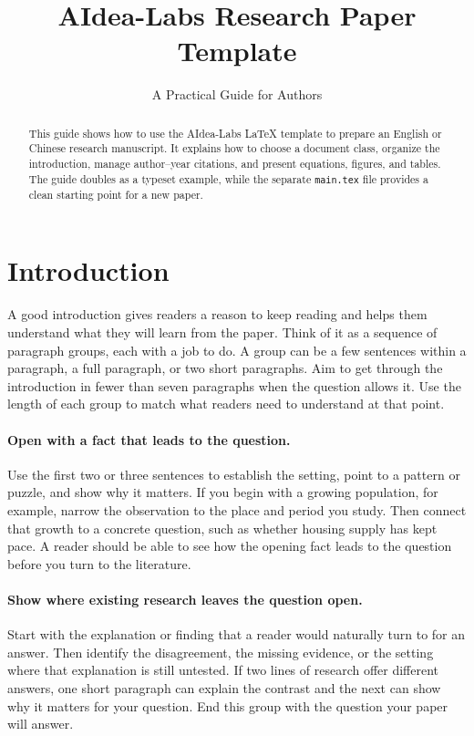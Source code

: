 \documentclass{templates/aidealabs-paper}
\title{AIdea-Labs Research Paper Template}
\subtitle{A Practical Guide for Authors}
\author{%
  \authorcontact{First Author\textsuperscript{1,*}}{first.author@aidea-labs.com}\hfill
  \authorcontact{Second Author\textsuperscript{1,2,*}}{second.author@aidea-labs.com}\hfill
  \authorcontact{Third Author\textsuperscript{2,\textdagger}}{third.author@aidea-labs.com}%
}
\affiliation{%
  \textsuperscript{1}AIdea-Labs\\[-0.1em]
  \textsuperscript{2}Department or University Name
}
\begin{document}
\maketitle

\begin{abstract}
This guide shows how to use the AIdea-Labs LaTeX template to prepare an English or Chinese research manuscript.
It explains how to choose a document class, organize the introduction, manage author--year citations, and present equations, figures, and tables.
The guide doubles as a typeset example, while the separate \texttt{main.tex} file provides a clean starting point for a new paper.
\end{abstract}

\section{Introduction}
A good introduction gives readers a reason to keep reading and helps them understand what they will learn from the paper.
Think of it as a sequence of paragraph groups, each with a job to do.
A group can be a few sentences within a paragraph, a full paragraph, or two short paragraphs.
Aim to get through the introduction in fewer than seven paragraphs when the question allows it.
Use the length of each group to match what readers need to understand at that point.

\paragraph{Open with a fact that leads to the question.}
Use the first two or three sentences to establish the setting, point to a pattern or puzzle, and show why it matters.
If you begin with a growing population, for example, narrow the observation to the place and period you study.
Then connect that growth to a concrete question, such as whether housing supply has kept pace.
A reader should be able to see how the opening fact leads to the question before you turn to the literature.

\paragraph{Show where existing research leaves the question open.}
Start with the explanation or finding that a reader would naturally turn to for an answer.
Then identify the disagreement, the missing evidence, or the setting where that explanation is still untested.
If two lines of research offer different answers, one short paragraph can explain the contrast and the next can show why it matters for your question.
End this group with the question your paper will answer.
\end{document}
